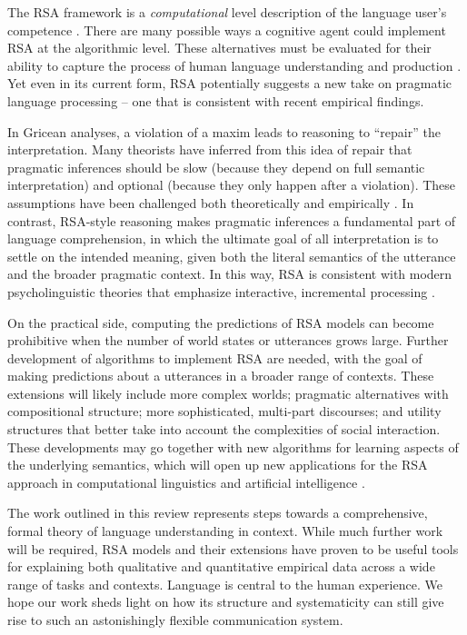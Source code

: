 \documentclass[]{elsarticle}
\begin{document}
The RSA framework is a \emph{computational} level description of the
language user's competence \citep{marr1982}. There are many
possible ways a cognitive agent could implement RSA at the algorithmic
level. These alternatives must be evaluated for their ability to capture
the process of human language understanding and production \citep{degen2015,nordmeyer2014}. Yet even in its
current form, RSA potentially suggests a new take on pragmatic language
processing -- one that is consistent with recent empirical
findings.

In Gricean analyses, a violation of a maxim leads to reasoning
to ``repair'' the interpretation. Many theorists have inferred from this
idea of repair that pragmatic inferences should be slow (because they
depend on full semantic interpretation) and optional (because they only
happen after a violation). These assumptions have been
challenged both theoretically and empirically \citep[e.g.,][]{levinson2000,grodner2010}. In contrast, RSA-style reasoning makes pragmatic inferences a fundamental part of language comprehension, in which the ultimate goal of all interpretation is to settle on the intended
meaning, given both the literal semantics of the utterance and the
broader pragmatic context. In this way, RSA is consistent with modern
psycholinguistic theories that emphasize interactive, incremental
processing \citep{degen2015}.

On the practical side, computing the predictions of RSA models can
become prohibitive when the number of world states or utterances grows
large. Further development of algorithms to implement RSA are needed,
with the goal of making predictions about a utterances in a broader
range of contexts. These extensions will likely include more complex
worlds; pragmatic alternatives with compositional structure; more
sophisticated, multi-part discourses; and utility structures that better
take into account the complexities of social interaction. These
developments may go together with new algorithms for learning aspects of
the underlying semantics, which will open up new applications for the
RSA approach in computational linguistics and artificial intelligence \citep{golland2010,vogel2013b,monroe2015,andreas2016}.

The work outlined in this review represents steps towards a
comprehensive, formal theory of language understanding in context. While
much further work will be required, RSA models and their extensions have
proven to be useful tools for explaining both qualitative and
quantitative empirical data across a wide range of tasks and contexts.
Language is central to the human experience. We hope our work sheds
light on how its structure and systematicity can still give rise to such
an astonishingly flexible communication system.
\end{document}
